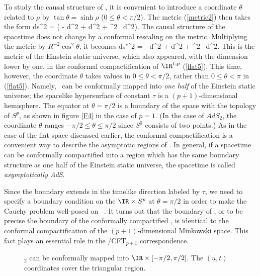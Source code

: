 To study the causal structure of \adsp, it is convenient to introduce
a coordinate $\theta$ related to $\rho$ by $\tan \theta = \sinh \rho$
($0 \leq \theta < \pi/2$). The metric (\ref{metric2}) then takes
the form
\beq
   ds^2 = 
        ( - d\tau^2 + d\theta^2 + \sin^2 \theta\ d\Omega^2).
\label{metric3}
\eeq
The causal structure of the spacetime does not change by a conformal
rescaling on the metric. Multiplying the metric by 
$R^{-2} \cos^2 \theta$, it
becomes 
\beq
 ds'^2 =  - d\tau^2 + d\theta^2 + \sin^2 \theta\ d\Omega^2.
\label{metric4}
\eeq
This is the metric of the Einstein static universe, which
also appeared, with the dimension lower by one, in
the conformal compactification of $\IR^{1,p}$ (\ref{flat5}). 
This time, however,  
the coordinate $\theta$ takes values in $0 \leq \theta < \pi/2$, rather
than $0 \leq \theta < \pi$ in (\ref{flat5}). Namely, \adsp\ can be 
conformally mapped
into {\it one half} of the Einstein static universe; the spacelike
hypersurface of constant $\tau$ is a $(p+1)$-dimensional
hemisphere.  The equator at $\theta = \pi/2$ is a boundary of the space
with the topology of $S^p$, as shown in figure \ref{F4} in the case of
$p=1$. (In the case of $AdS_2$, the coordinate $\theta$ ranges
$-\pi/2 \leq \theta \leq \pi/2$ since $S^0$ consists of two points.)
As in the case of the flat space discussed earlier, the
conformal compactification is a convenient way to describe the
asymptotic regions of \ads . In general, if a spacetime can
be conformally compactified into a region which has the same
boundary structure as one half of the Einstein static universe,
the spacetime is called {\it asymptotically AdS}. 

Since the boundary extends in the timelike
direction labeled by $\tau$, 
we need to specify a boundary condition on
the $\IR \times S^p$ at $\theta = \pi/2$ in order
to make the Cauchy problem well-posed on \ads\ \cite{Avis:1978yn}. 
It turns out that the boundary of \adsp , or to be precise the
boundary of the conformally compactified \adsp , is identical
to the conformal compactification of the $(p+1)$-dimensional
Minkowski space. This fact plays an essential role
in the \adsp/CFT$_{p+1}$ correspondence.

\begin{figure}[htb]
\begin{center}
\epsfxsize=3in\leavevmode{}
\end{center}
\caption{\ads$_2$ can be conformally mapped into $\IR \times [-\pi/2,\pi/2]$.
The $(u,t)$ coordinates cover the triangular region.}
\label{F5}
\end{figure} 

